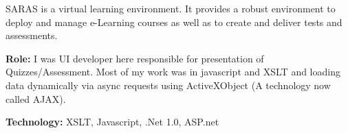 \begin{resume}
\begin{position}
SARAS is a virtual learning environment. It provides a robust environment to deploy and manage e-Learning courses as well as to create and deliver tests and assessments.

{\textbf{Role:}} I was UI developer here responsible for presentation of Quizzes/Assessment. Most of my work was in javascript and XSLT and loading data dynamically via async requests using ActiveXObject (A technology now called AJAX).

{\textbf{Technology:}} XSLT, Javascript, .Net 1.0, ASP.net
\end{position}\\

\end{resume}

